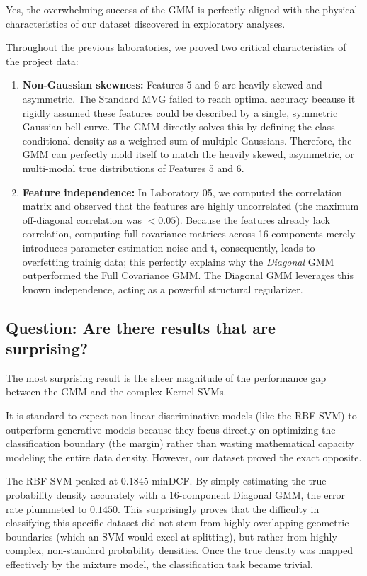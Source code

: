 Yes, the overwhelming success of the GMM is perfectly aligned with the physical characteristics of our dataset discovered in exploratory analyses. 

Throughout the previous laboratories, we proved two critical characteristics of the project data:
\begin{enumerate}
    \item \textbf{Non-Gaussian skewness:} Features 5 and 6 are heavily skewed and asymmetric. The Standard MVG failed to reach optimal accuracy because it rigidly assumed these features could be described by a single, symmetric Gaussian bell curve. The GMM directly solves this by defining the class-conditional density as a weighted sum of multiple Gaussians. Therefore, the GMM can perfectly mold itself to match the heavily skewed, asymmetric, or multi-modal true distributions of Features 5 and 6.
    \item \textbf{Feature independence:} In Laboratory 05, we computed the correlation matrix and observed that the features are highly uncorrelated (the maximum off-diagonal correlation was $< 0.05$). Because the features already lack correlation, computing full covariance matrices across 16 components merely introduces parameter estimation noise and t, consequently, leads to overfetting trainig data; this perfectly explains why the \textit{Diagonal} GMM outperformed the Full Covariance GMM.  The Diagonal GMM leverages this known independence, acting as a powerful structural regularizer.
\end{enumerate}

\subsection*{Question: Are there results that are surprising?}

The most surprising result is the sheer magnitude of the performance gap between the GMM and the complex Kernel SVMs. 

It is standard to expect non-linear discriminative models (like the RBF SVM) to outperform generative models because they focus directly on optimizing the classification boundary (the margin) rather than wasting mathematical capacity modeling the entire data density. However, our dataset proved the exact opposite. 

The RBF SVM peaked at $0.1845$ minDCF. By simply estimating the true probability density accurately with a 16-component Diagonal GMM, the error rate plummeted to $0.1450$. This surprisingly proves that the difficulty in classifying this specific dataset did not stem from highly overlapping geometric boundaries (which an SVM would excel at splitting), but rather from highly complex, non-standard probability densities. Once the true density was mapped effectively by the mixture model, the classification task became trivial.